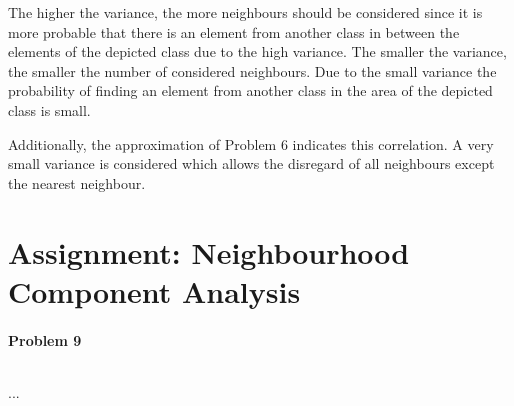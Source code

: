 \documentclass{article}
\begin{document}
The higher the variance, the more neighbours should be considered since it is more probable that there is an element from another class in between the elements of the depicted class due to the high variance. The smaller the variance, the smaller the number of considered neighbours. Due to the small variance the probability of finding an element from another class in the area of the depicted class is small.

Additionally, the approximation of Problem 6 indicates this correlation. A very small variance is considered which allows the disregard of all neighbours except the nearest neighbour.

\section{Assignment: Neighbourhood Component Analysis}

\paragraph*{Problem 9}
$\;$ 

...
\end{document}

